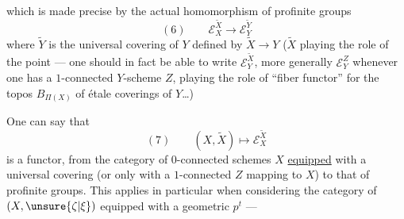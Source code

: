 
which is made precise by the actual homomorphism of profinite groups
\[
(6)\qquad \mathcal E_X^{\widetilde X}\longrightarrow\mathcal E_Y^{\widetilde Y}
\]
where $\widetilde Y$ is the universal covering of $Y$ defined by $\widetilde X\longrightarrow Y$ ($\widetilde X$ playing the role of the point --- one should in fact be able to write $\mathcal E_Y^{\widetilde X}$, more generally $\mathcal E_Y^Z$ whenever one has a $1$-connected $Y$-scheme $Z$, playing the role of ``fiber functor'' for the topos $B_{\Pi(X)}$ of étale coverings of $Y$\ldots)


One can say that
\[
(7)\qquad (X,\widetilde X)\longmapsto\mathcal E_X^{\widetilde X}
\]
is a functor, from the category of $0$-connected schemes $X$ \uline{equipped} with a universal covering (or only with a $1$-connected $Z$ mapping to $X$) to that of profinite groups. This applies in particular when considering the category of $(X,\unsure{\zeta|\xi})$ equipped with a geometric $p^t$ ---

